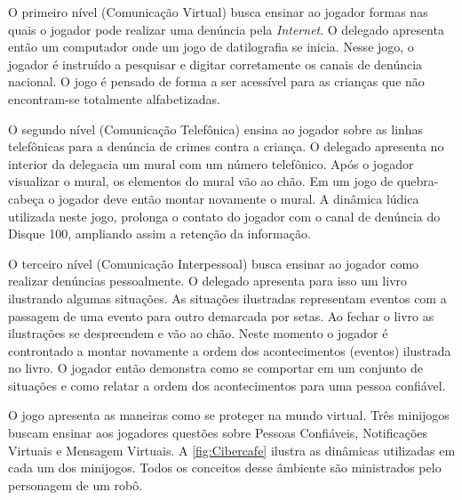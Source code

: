 O primeiro nível (Comunicação Virtual) busca ensinar ao jogador formas nas quais o jogador pode realizar uma denúncia pela \textit{Internet}. O delegado apresenta então um computador onde um jogo de datilografia se inicia. Nesse jogo, o jogador é instruído a pesquisar e digitar corretamente os canais de denúncia nacional. O jogo é pensado de forma a ser acessível para as crianças que não encontram-se totalmente alfabetizadas. 

O segundo nível (Comunicação Telefônica) ensina ao jogador sobre as linhas telefônicas para a denúncia de crimes contra a criança. O delegado apresenta no interior da delegacia um mural com um número telefônico. Após o jogador visualizar o mural, os elementos do mural vão ao chão. Em um jogo de quebra-cabeça o jogador deve então montar novamente o mural. A dinâmica lúdica utilizada neste jogo, prolonga o contato do jogador com o canal de denúncia do Disque 100, ampliando assim a retenção da informação. 

O terceiro nível (Comunicação Interpessoal) busca ensinar ao jogador como realizar denúncias pessoalmente. O delegado apresenta para isso um livro ilustrando algumas situações. As situações ilustradas representam eventos com a passagem de uma evento para outro demarcada por setas. Ao fechar o livro as ilustrações se despreendem e vão ao chão. Neste momento o jogador é controntado a montar novamente a ordem dos acontecimentos (eventos) ilustrada no livro. O jogador então demonstra como se comportar em um conjunto de situações e como relatar a ordem dos acontecimentos para uma pessoa confiável. 

O jogo apresenta as maneiras como se proteger na mundo virtual. Três minijogos buscam ensinar aos jogadores questões sobre Pessoas Confiáveis, Notificações Virtuais e Mensagem Virtuais. A \autoref{fig:Cibercafe} ilustra as dinâmicas utilizadas em cada um dos minijogos. Todos os conceitos desse âmbiente são ministrados pelo personagem de um robô. 


